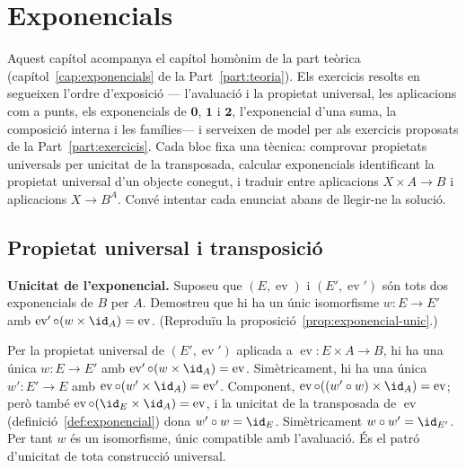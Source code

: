\chapter{Exponencials}\label{cap:practica-exponencials}

Aquest capítol acompanya el capítol homònim de la part teòrica (capítol~\ref{cap:exponencials} de la Part~\ref{part:teoria}). Els exercicis resolts en segueixen l'ordre d'exposició --- l'avaluació i la propietat universal, les aplicacions com a punts, els exponencials de \(\mathbf0\), \(\mathbf1\) i \(\mathbf2\), l'exponencial d'una suma, la composició interna i les famílies--- i serveixen de model per als exercicis proposats de la Part~\ref{part:exercicis}. Cada bloc fixa una tècnica: comprovar propietats universals per unicitat de la transposada, calcular exponencials identificant la propietat universal d'un objecte conegut, i traduir entre aplicacions \(X\times A\to B\) i aplicacions \(X\to B^A\). Convé intentar cada enunciat abans de llegir-ne la solució.

\section{Propietat universal i transposició}\label{prac:exp-universal}

\begin{exercici}
\textbf{Unicitat de l'exponencial.} Suposeu que \((E,\operatorname{ev})\) i \((E',\operatorname{ev}')\) són tots dos exponencials de \(B\) per \(A\). Demostreu que hi ha un únic isomorfisme \(w\colon E\to E'\) amb \(\operatorname{ev}'\circ(w\times\id_A)=\operatorname{ev}\). (Reproduïu la proposició~\ref{prop:exponencial-unic}.)
\end{exercici}
\begin{solucio}
Per la propietat universal de \((E',\operatorname{ev}')\) aplicada a \(\operatorname{ev}\colon E\times A\to B\), hi ha una única \(w\colon E\to E'\) amb \(\operatorname{ev}'\circ(w\times\id_A)=\operatorname{ev}\). Simètricament, hi ha una única \(w'\colon E'\to E\) amb \(\operatorname{ev}\circ(w'\times\id_A)=\operatorname{ev}'\). Component, \(\operatorname{ev}\circ((w'\circ w)\times\id_A)=\operatorname{ev}\); però també \(\operatorname{ev}\circ(\id_E\times\id_A)=\operatorname{ev}\), i la unicitat de la transposada de \(\operatorname{ev}\) (definició~\ref{def:exponencial}) dona \(w'\circ w=\id_E\). Simètricament \(w\circ w'=\id_{E'}\). Per tant \(w\) és un isomorfisme, únic compatible amb l'avaluació. És el patró d'unicitat de tota construcció universal.
\end{solucio}

